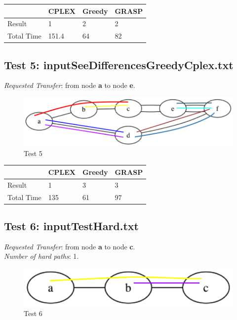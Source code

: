 \documentclass[11pt,a4paper]{article}
\begin{document}
\begin{tabular}{| l | l | l | l |}
\hline
 & CPLEX & Greedy & GRASP \\ \hline
Result & 1 & 2 & 2 \\ \hline
Total Time & 151.4 & 64 & 82 \\ \hline
\end{tabular}

\subsection{Test 5: inputSeeDifferencesGreedyCplex.txt}

\textit{Requested Transfer}: from node \textbf{a} to node \textbf{e}.\\

\begin{figure}[H]
  \centering
    \includegraphics[scale=0.7]{inputSeeDifferencesGreedyCplex.png}
  \caption{Test 5}
  \label{fig:test5}
\end{figure}

\begin{tabular}{| l | l | l | l |}
\hline
 & CPLEX & Greedy & GRASP \\ \hline
Result & 1 & 3 & 3 \\ \hline
Total Time & 135 & 61 & 97 \\ \hline
\end{tabular}

\subsection{Test 6: inputTestHard.txt}

\textit{Requested Transfer}: from node \textbf{a} to node \textbf{c}.\\
\textit{Number of hard paths}: 1.\\

\begin{figure}[H]
  \centering
    \includegraphics[scale=0.7]{inputTestHard.png}
  \caption{Test 6}
  \label{fig:test6}
\end{figure}
\end{document}
